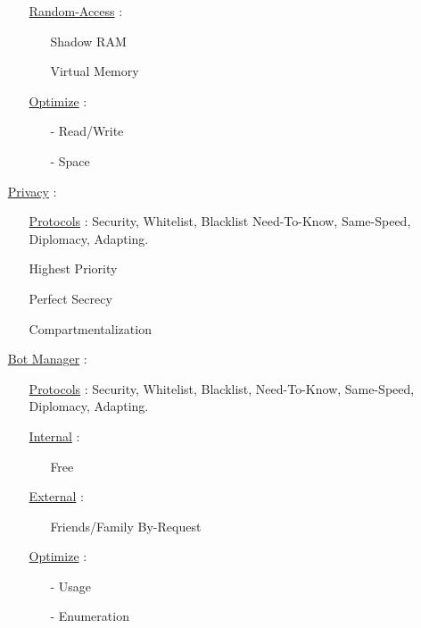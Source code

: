 \documentclass[11pt]{article}
\begin{document}
\begin{enumerate}
\begin{enumerate}
		\item[] \ul{Random-Access} :
		\begin{enumerate}
			\item[] Shadow RAM
			\item[] Virtual Memory
		\end{enumerate}
		
		\item[] \ul{Optimize}  :
		\begin{enumerate}
			\item[-] Read/Write
			\item[-] Space
		\end{enumerate}
	\end{enumerate}

	\item[] \ul{Privacy} :
	\begin{enumerate}
		\item[] \ul{Protocols} : Security, Whitelist, Blacklist Need-To-Know, Same-Speed, Diplomacy,  Adapting.
		\item[] Highest Priority
		\item[] Perfect Secrecy
		\item[] Compartmentalization
	\end{enumerate}
	
	\item[] \ul{Bot Manager} :
	\begin{enumerate}
		\item[] \ul{Protocols} : Security, Whitelist, Blacklist, Need-To-Know, Same-Speed, Diplomacy,  Adapting.
		
		\item[] \ul{Internal}  :
		\begin{enumerate}
			\item[] Free
		\end{enumerate}
	
		\item[] \ul{External} :
		\begin{enumerate}
			\item[] Friends/Family By-Request
		\end{enumerate}

		\item[] \ul{Optimize}  :
		\begin{enumerate}
			\item[-] Usage
			\item[-] Enumeration
		\end{enumerate}
	\end{enumerate}
\end{enumerate}
\end{document}
